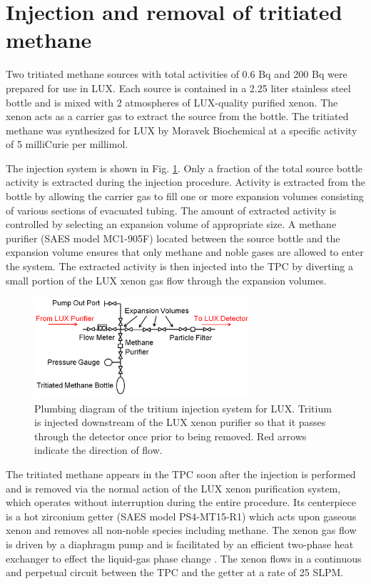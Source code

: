 
\section{Injection and removal of tritiated methane}

Two tritiated methane sources with total activities of 0.6 Bq and 200 Bq were prepared for use in LUX. Each source is contained in a 2.25 liter stainless steel bottle and is mixed with 2 atmospheres of LUX-quality purified xenon. The xenon acts as a carrier gas to extract the source from the bottle. The tritiated methane was synthesized for LUX by Moravek Biochemical \cite{moravek} at a specific activity of 5 milliCurie per millimol.

The injection system is shown in Fig. \ref{fig:plumbing}. Only a fraction of the total source bottle activity is extracted during the injection procedure. Activity is extracted from the bottle by allowing the carrier gas to fill one or more expansion volumes consisting of various sections of evacuated tubing. The amount of extracted activity is controlled by selecting an expansion volume of appropriate size. A methane purifier (SAES model MC1-905F) located between the source bottle and the expansion volume ensures that only methane and noble gases are allowed to enter the system. The extracted activity is then injected into the TPC by diverting a small portion of the LUX xenon gas flow through the expansion volumes. 

\begin{figure}[H]\centering
\includegraphics[width=80mm]{TritiumPlumbing.png}
\caption{Plumbing diagram of the tritium injection system for LUX.  Tritium is injected downstream of the LUX xenon purifier so that it passes through the detector once prior to being removed.  Red arrows indicate the direction of flow.}
\label{fig:plumbing}
\end{figure}

The tritiated methane appears in the TPC soon after the injection is performed and is removed via the normal action of the LUX xenon purification system, which operates without interruption during the entire procedure. Its centerpiece is a hot zirconium getter (SAES model PS4-MT15-R1) which acts upon gaseous xenon and removes all non-noble species including methane. The xenon gas flow is driven by a diaphragm pump and is facilitated by an efficient two-phase heat exchanger to effect the liquid-gas phase change \cite{two phase_hx}. The xenon flows in a continuous and perpetual circuit between the TPC and the getter at a rate of 25 SLPM. 

